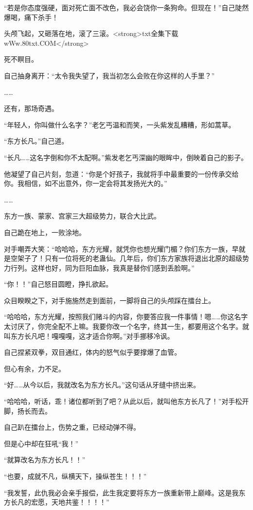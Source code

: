 \begin{this_body}
“若是你态度强硬，面对死亡面不改色，我必会饶你一条狗命。但现在！”自己陡然爆喝，痛下杀手！

头颅飞起，又砸落在地，滚了三滚。<strong>txt全集下载wWw.80txt.COM</strong>

死不瞑目。

自己抽身离开：“太令我失望了，我当初怎么会败在你这样的人手里？”

……

还有，那场奇遇。

“年轻人，你叫做什么名字？”老乞丐温和而笑，一头紫发乱糟糟，形如蒿草。

“东方长凡。”自己道。

“长凡……这名字倒和你不太配啊。”紫发老乞丐深幽的眼眸中，倒映着自己的影子。

他凝望了自己片刻，忽道：“你是个好孩子，我就将手中最重要的一份传承交给你。我相信，如不出意外，你一定会将其发扬光大的。”

……

东方一族、蒙家、宫家三大超级势力，联合大比武。

自己跪在地上，一败涂地。

对手嘲弄大笑：“哈哈哈，东方光耀，就凭你也想光耀门楣？你们东方一族，早就是空架子了！只有一位将死的老蛊仙。几年后，你们东方家族将退出北原的超级势力行列。这样也好，同为巨阳血脉，我真是替你们感到丢脸啊。”

“你！！”自己怒目圆瞪，挣扎欲起。

众目睽睽之下，对手施施然走到面前，一脚将自己的头颅踩在擂台上。

“哈哈哈，东方光耀，按照我们赌斗的内容，你要答应我一件事情！嗯……你这名字太讨厌了，你完全配不上嘛。我要你改一个名字，终其一生，都要用这个名字。就叫东方长凡吧！嘎嘎嘎，这才适合你啊。”对手挪移冷讽。

自己捏紧双拳，双目通红，体内的怒气似乎要撑爆了血管。

但心有余，力不足。

“好……从今以后，我就改名为东方长凡。”这句话从牙缝中挤出来。

“哈哈哈，听话，乖！诸位都听到了吧？从此以后，就叫他东方长凡了！”对手松开脚，扬长而去。

自己趴在擂台上，伤势之重，已经动弹不得。

但是心中却在狂吼“我！”

“就算改名为东方长凡！！”

“也要，成就不凡，纵横天下，操纵苍生！！！”

“我发誓，此仇我必会亲手报偿，此生我定要将东方一族重新带上巅峰。这是我东方长凡的宏愿，天地共鉴！！！！”


\end{this_body}
